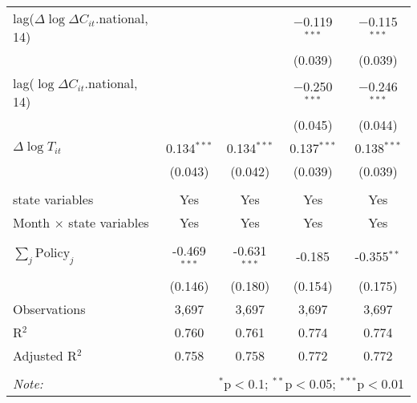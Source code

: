 \begin{tabular}{@{\extracolsep{1pt}}lcccc}
  lag($\Delta \log \Delta C_{it}$.national, 14) &  &  & $-$0.119$^{***}$ & $-$0.115$^{***}$ \\ 
  &  &  & (0.039) & (0.039) \\ 
  lag($\log \Delta C_{it}$.national, 14) &  &  & $-$0.250$^{***}$ & $-$0.246$^{***}$ \\ 
  &  &  & (0.045) & (0.044) \\ 
  $\Delta \log T_{it}$ & 0.134$^{***}$ & 0.134$^{***}$ & 0.137$^{***}$ & 0.138$^{***}$ \\ 
  & (0.043) & (0.042) & (0.039) & (0.039) \\ 
 \hline \\[-1.8ex] 
state variables & Yes & Yes & Yes & Yes \\ 
Month $\times$ state variables & Yes & Yes & Yes & Yes \\ 
\hline \\[-1.8ex] 
$\sum_j \mathrm{Policy}_j$ & -0.469$^{***}$ & -0.631$^{***}$ & -0.185 & -0.355$^{**}$ \\ 
 & (0.146) & (0.180) & (0.154) & (0.175) \\ 
Observations & 3,697 & 3,697 & 3,697 & 3,697 \\ 
R$^{2}$ & 0.760 & 0.761 & 0.774 & 0.774 \\ 
Adjusted R$^{2}$ & 0.758 & 0.758 & 0.772 & 0.772 \\ 
\hline 
\hline \\[-1.8ex] 
\textit{Note:}  & \multicolumn{4}{r}{$^{*}$p$<$0.1; $^{**}$p$<$0.05; $^{***}$p$<$0.01} \\ 
\end{tabular} 